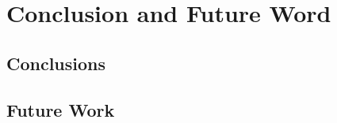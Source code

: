 
\chapter{Conclusion and Future Word} %

\label{Chapter7} %



\section{Conclusions}

\section{Future Work}
